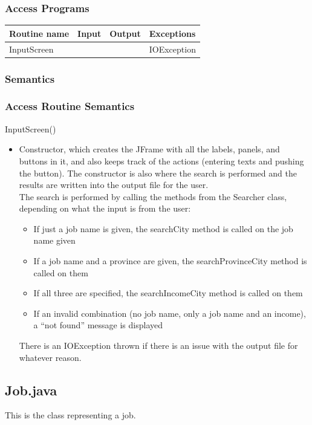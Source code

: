 \documentclass[12pt,fleqn]{article}
\begin{document}
\subsubsection* {Access Programs}
\begin{tabular}{| l | l | l | l |}
\hline
\textbf{Routine name} & \textbf{Input} & \textbf{Output} & \textbf{Exceptions}\\
\hline
InputScreen & ~ & ~ & IOException\\
\hline
\end{tabular}

\subsubsection*{Semantics}
\subsubsection*{Access Routine Semantics}
\noindent InputScreen()
\begin{itemize}
\item Constructor, which creates the JFrame with all the labels, panels, and buttons in it, and also keeps track
of the actions (entering texts and pushing the button). The constructor is also where the search is
performed and the results are written into the output file for the user.\\
The search is performed by calling the methods from the Searcher class, depending on what the input is
from the user:
\begin{itemize}
\item If just a job name is given, the searchCity method is called on the job name given
\item If a job name and a province are given, the searchProvinceCity method is called on them
\item If all three are specified, the searchIncomeCity method is called on them
\item If an invalid combination (no job name, only a job name and an income), a “not found” message
is displayed
\end{itemize}
There is an IOException thrown if there is an issue with the output file for whatever reason.
\end{itemize}


\subsection*{Job.java}\label{job}
This is the class representing a job. 
\end{document}
